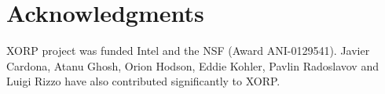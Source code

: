 
\section*{Acknowledgments}

XORP project was funded Intel and the NSF (Award ANI-0129541).  Javier
Cardona, Atanu Ghosh, Orion Hodson, Eddie Kohler, Pavlin Radoslavov
and Luigi Rizzo have also contributed significantly to XORP.

